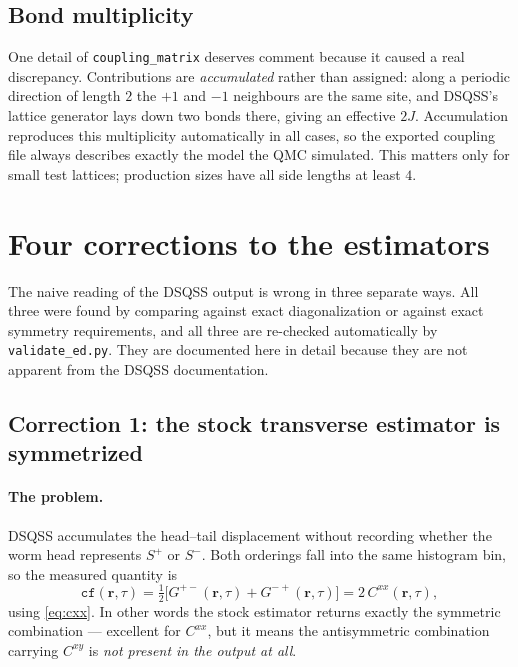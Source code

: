 \documentclass[11pt,a4paper]{article}
\newcommand{\Sp}{S^{+}}
\newcommand{\Sm}{S^{-}}
\newcommand{\Gpm}{G^{+-}}
\newcommand{\Gmp}{G^{-+}}
\newcommand{\code}[1]{\texttt{#1}}
\begin{document}
\subsection{Bond multiplicity}

One detail of \code{coupling\_matrix} deserves comment because it caused a real
discrepancy. Contributions are \emph{accumulated} rather than assigned:
along a periodic direction of length $2$ the $+1$ and $-1$ neighbours are the
same site, and DSQSS's lattice generator lays down two bonds there, giving an
effective $2J$. Accumulation reproduces this multiplicity automatically in all
cases, so the exported coupling file always describes exactly the model the QMC
simulated. This matters only for small test lattices; production sizes have all
side lengths at least $4$.

\section{Four corrections to the estimators}
\label{sec:corrections}

The naive reading of the DSQSS output is wrong in three separate ways. All three
were found by comparing against exact diagonalization or against exact symmetry
requirements, and all three are re-checked automatically by
\code{validate\_ed.py}. They are documented here in detail because they are not
apparent from the DSQSS documentation.

\subsection{Correction 1: the stock transverse estimator is symmetrized}
\label{sec:corr1}

\paragraph{The problem.} DSQSS accumulates the head--tail displacement without
recording whether the worm head represents $\Sp$ or $\Sm$. Both orderings fall
into the same histogram bin, so the measured quantity is
\begin{equation}
  \code{cf}(\mathbf{r},\tau)
  = \tfrac12\bigl[\Gpm(\mathbf{r},\tau) + \Gmp(\mathbf{r},\tau)\bigr]
  = 2\,C^{xx}(\mathbf{r},\tau),
  \label{eq:cfmeaning}
\end{equation}
using \eqref{eq:cxx}. In other words the stock estimator returns exactly the
symmetric combination --- excellent for $C^{xx}$, but it means the antisymmetric
combination carrying $C^{xy}$ is \emph{not present in the output at all}.
\end{document}
